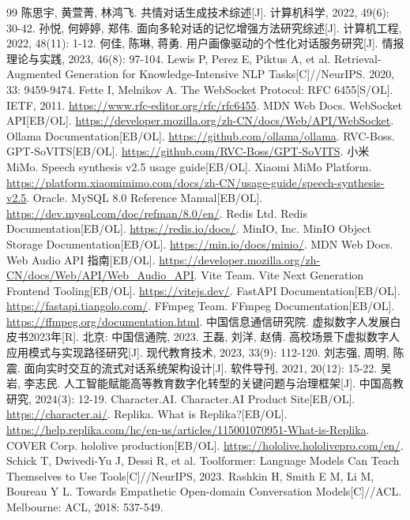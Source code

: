 \documentclass{base}
\begin{document}
\begin{thebibliography}{99}
 陈思宇, 黄萱菁, 林鸿飞. 共情对话生成技术综述[J]. 计算机科学, 2022, 49(6): 30-42.
 孙悦, 何婷婷, 郑伟. 面向多轮对话的记忆增强方法研究综述[J]. 计算机工程, 2022, 48(11): 1-12.
 何佳, 陈琳, 蒋勇. 用户画像驱动的个性化对话服务研究[J]. 情报理论与实践, 2023, 46(8): 97-104.
 Lewis P, Perez E, Piktus A, et al. Retrieval-Augmented Generation for Knowledge-Intensive NLP Tasks[C]//NeurIPS. 2020, 33: 9459-9474.
 Fette I, Melnikov A. The WebSocket Protocol: RFC 6455[S/OL]. IETF, 2011. \url{https://www.rfc-editor.org/rfc/rfc6455}.
 MDN Web Docs. WebSocket API[EB/OL]. \url{https://developer.mozilla.org/zh-CN/docs/Web/API/WebSocket}.
 Ollama Documentation[EB/OL]. \url{https://github.com/ollama/ollama}.
 RVC-Boss. GPT-SoVITS[EB/OL]. \url{https://github.com/RVC-Boss/GPT-SoVITS}.
 小米 MiMo. Speech synthesis v2.5 usage guide[EB/OL]. Xiaomi MiMo Platform. \url{https://platform.xiaomimimo.com/docs/zh-CN/usage-guide/speech-synthesis-v2.5}.
 Oracle. MySQL 8.0 Reference Manual[EB/OL]. \url{https://dev.mysql.com/doc/refman/8.0/en/}.
 Redis Ltd. Redis Documentation[EB/OL]. \url{https://redis.io/docs/}.
 MinIO, Inc. MinIO Object Storage Documentation[EB/OL]. \url{https://min.io/docs/minio/}.
 MDN Web Docs. Web Audio API 指南[EB/OL]. \url{https://developer.mozilla.org/zh-CN/docs/Web/API/Web_Audio_API}.
 Vite Team. Vite Next Generation Frontend Tooling[EB/OL]. \url{https://vitejs.dev/}.
 FastAPI Documentation[EB/OL]. \url{https://fastapi.tiangolo.com/}.
 FFmpeg Team. FFmpeg Documentation[EB/OL]. \url{https://ffmpeg.org/documentation.html}.
 中国信息通信研究院. 虚拟数字人发展白皮书2023年[R]. 北京: 中国信通院, 2023.
 王磊, 刘洋, 赵倩. 高校场景下虚拟数字人应用模式与实现路径研究[J]. 现代教育技术, 2023, 33(9): 112-120.
 刘志强, 周明, 陈震. 面向实时交互的流式对话系统架构设计[J]. 软件导刊, 2021, 20(12): 15-22.
 吴岩, 李志民. 人工智能赋能高等教育数字化转型的关键问题与治理框架[J]. 中国高教研究, 2024(3): 12-19.
 Character.AI. Character.AI Product Site[EB/OL]. \url{https://character.ai/}.
 Replika. What is Replika?[EB/OL]. \url{https://help.replika.com/hc/en-us/articles/115001070951-What-is-Replika}.
 COVER Corp. hololive production[EB/OL]. \url{https://hololive.hololivepro.com/en/}.
 Schick T, Dwivedi-Yu J, Dessi R, et al. Toolformer: Language Models Can Teach Themselves to Use Tools[C]//NeurIPS, 2023.
 Rashkin H, Smith E M, Li M, Boureau Y L. Towards Empathetic Open-domain Conversation Models[C]//ACL. Melbourne: ACL, 2018: 537-549.
\end{thebibliography}
\end{document}
